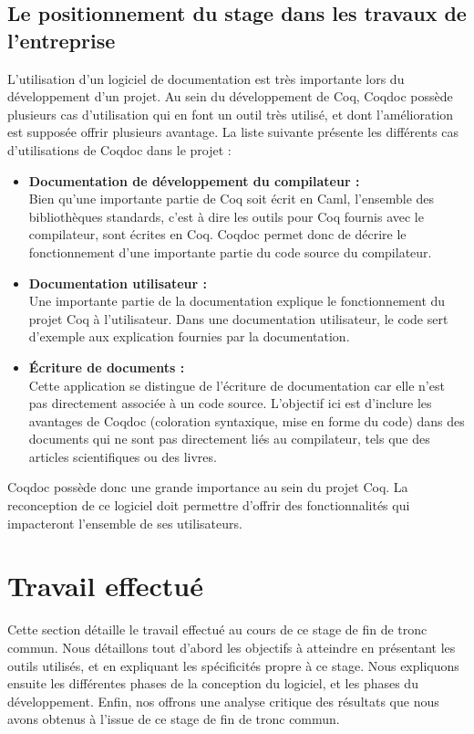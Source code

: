\documentclass[a4paper, 11pt]{report}
\begin{document}
      \section{Le positionnement du stage dans les travaux de l'entreprise}
      L'utilisation d'un logiciel de documentation est très importante lors du
      développement d'un projet.
      Au sein du développement de Coq, Coqdoc possède plusieurs cas
      d'utilisation qui en font un outil très utilisé, et dont l'amélioration
      est supposée offrir plusieurs avantage. La liste suivante
      présente les différents cas d'utilisations de Coqdoc dans le projet :
      \begin{itemize}
        \item \textbf{Documentation de développement du compilateur :} \\
          Bien qu'une importante partie de Coq soit écrit en Caml, l'ensemble
          des bibliothèques standards, c'est à dire les outils pour Coq
          fournis avec le compilateur, sont écrites en Coq. Coqdoc permet donc
          de décrire le fonctionnement d'une importante partie du code source
          du compilateur.
        \item \textbf{Documentation utilisateur :} \\
          Une importante partie de la documentation explique le fonctionnement
          du projet Coq à l'utilisateur. Dans une documentation utilisateur,
          le code sert d'exemple aux explication fournies par la documentation.
        \item \textbf{Écriture de documents :} \\
          Cette application se distingue de l'écriture de documentation car
          elle n'est pas directement associée à un code source. L'objectif ici
          est d'inclure les avantages de Coqdoc (coloration syntaxique,
          mise en forme du code) dans des documents qui ne sont pas directement
          liés au compilateur, tels que des articles scientifiques ou des
          livres.
      \end{itemize}

      Coqdoc possède donc une grande importance au sein du projet Coq. La
      reconception de ce logiciel doit permettre d'offrir des fonctionnalités
      qui impacteront l'ensemble de ses utilisateurs.

\chapter{Travail effectué}
Cette section détaille le travail effectué au cours de ce stage de fin de tronc
commun. Nous détaillons tout d'abord les objectifs à atteindre en présentant
les outils utilisés, et en expliquant les spécificités propre à ce stage.
Nous expliquons ensuite les différentes phases de la conception du logiciel,
et les phases du développement. Enfin, nos offrons une analyse critique des
résultats que nous avons obtenus à l'issue de ce stage de fin de tronc commun.
\end{document}
